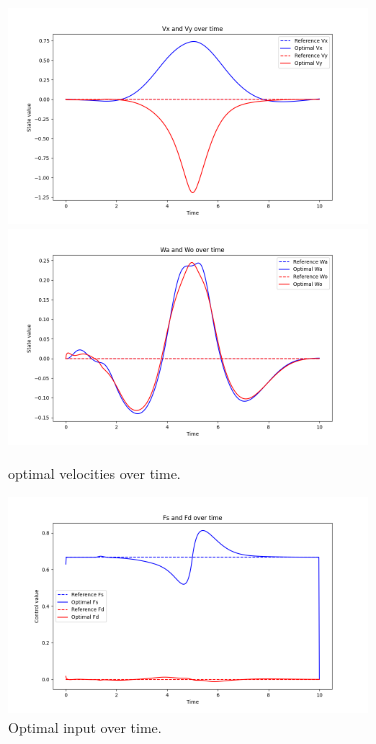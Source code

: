 \begin{figure}[H]
  \centering
  \includegraphics[width=0.85\textwidth]{pictures/vx and vy opt.png}\hfill \\
  \includegraphics[width=0.85\textwidth]{pictures/omega alpha and theta.png}\hfill
  \caption{optimal velocities over time.}
  \label{fig:Reference trajectory}
  \includegraphics[width=0.85\textwidth]{pictures/Fs and Fd opt.png}
  \caption{Optimal input over time.}
  \label{fig:Reference trajectory}
\end{figure}



